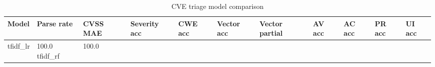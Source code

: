 \begin{table}
\caption{CVE triage model comparison}
\label{tab:results}
\begin{tabular}{lllllllllll}
\toprule
Model & Parse rate & CVSS MAE & Severity acc & CWE acc & Vector acc & Vector partial & AV acc & AC acc & PR acc & UI acc \\
\midrule
tfidf_lr & 100.0%
tfidf_rf & 100.0%
\bottomrule
\end{tabular}
\end{table}
